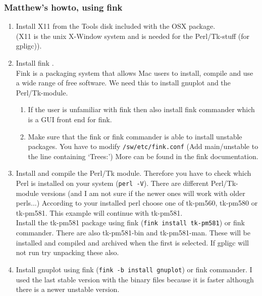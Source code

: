 \subsubsection{Matthew's howto, using fink}
\label{fink}
\begin{enumerate}

\item  Install X11 from the Tools disk included with the OSX package. \\
(X11 is the unix X-Window system and is needed for the  Perl/Tk-stuff (for gpligc)).

\item  Install fink \cite{fink}. \\
Fink is a packaging system that allows Mac users to install, compile and use a wide range of free software.
We need this to install gnuplot and the Perl/Tk-module.

    \begin{enumerate}
        \item  If the user is unfamiliar with fink then also install fink
                commander which is a GUI front end for fink.
        \item  Make sure that the fink or fink commander is able to install
            unstable packages.
            You have to modify \texttt{/sw/etc/fink.conf} (Add main/unstable to the line containing `Trees:')
            More can be found in the fink documentation.
    \end{enumerate}

\item  Install and compile the Perl/Tk module. Therefore you have to check which Perl is installed on your system (\texttt{perl -V}).
    There are different Perl/Tk-module versions (and I am not sure if the newer ones will work with older perls...)
    According to your installed perl choose one of tk-pm560, tk-pm580 or tk-pm581. This example will continue with tk-pm581.\\

Install the tk-pm581 package using fink (\texttt{fink install tk-pm581}) or fink
commander.  There are also tk-pm581-bin and tk-pm581-man.  These will
be installed and compiled and archived when the first is selected.  If
gpligc will not run try unpacking these also.

\item  Install gnuplot using fink (\texttt{fink -b install gnuplot}) or fink commander.  I used the last
stable version with the binary files because it is faster although
there is a newer unstable version.


\end{enumerate}
